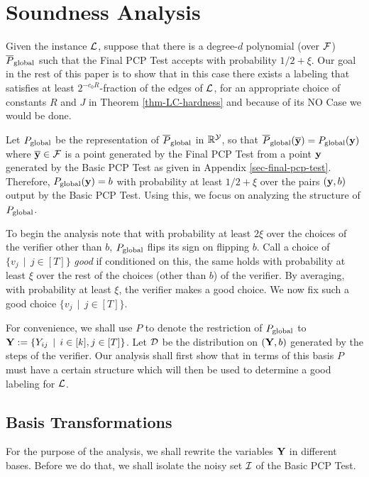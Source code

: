\section{Soundness Analysis}\label{sec-NO-case}
Given the \LC instance $\mathcal{L}$, suppose that there is a degree-$d$ polynomial (over $\mathcal{F}$) $\overline{P}_{\textnormal{global}}$ such that
the Final PCP Test accepts with probability $1/2 + \xi$. Our goal in the rest of this paper is to show that in this case there exists a labeling that satisfies at least $2^{-c_0R}$-fraction of the edges of $\mathcal{L}$, for an appropriate choice of constants $R$ and $J$ in Theorem \ref{thm-LC-hardness} and because of its NO Case we would be done.

Let $P_{\textnormal{global}}$ be the representation of $\overline{P}_{\textnormal{global}}$  in $\mathbb{R}^{\mathcal{Y}}$, so that  $\ol{P}_{\tn{global}}(\ol{\bf y}) = P_{\tn{global}}({\bf y})$ where $\ol{\bf y} \in \mc{F}$ is a point generated by the Final PCP Test from a point ${\bf y}$ generated by the Basic PCP Test as given in Appendix \ref{sec-final-pcp-test}. Therefore, $P_{\tn{global}}({\bf y}) = b$ with probability at least $1/2 + \xi$ over the pairs $({\bf y}, b)$ output by the Basic PCP Test. Using this, we focus on analyzing the structure of $P_{\textnormal{global}}$.

To begin the analysis note that with probability at least $2\xi$ over
the choices of the verifier other than $b$, $P_{\textnormal{global}}$ flips
its sign on flipping $b$.  Call a choice of $\{v_j\,\mid\, j \in [T]\}$ 
\emph{good} if conditioned on this, the same holds with
probability at least $\xi$ over the rest of the choices (other than $b$) of the
verifier. 
By averaging, with probability at least $\xi$,
the verifier makes a good choice. We now fix such a 
good choice $\{v_j\,\mid\, j \in [T]\}$.


For convenience, we shall use $P$ to denote the restriction of
$P_{\textnormal{global}}$ to ${\bf Y} := \{Y_{ij}\, \mid\, i\in[k], j\in [T]\}$. 
Let $\mathcal{D}$ be the distribution on $({\bf Y}, b)$ generated by the
steps of the verifier.
 Our analysis shall first show that  
in terms of this basis $P$ must have a  certain structure which  
will then be used to determine a good labeling for $\mathcal{L}$.


  
 

\subsection{Basis Transformations}
For the purpose of the analysis, we shall rewrite the variables
${\bf Y}$ in different bases. Before we
do that, we shall isolate the noisy set $\mathcal{I}$ of the Basic PCP Test.



